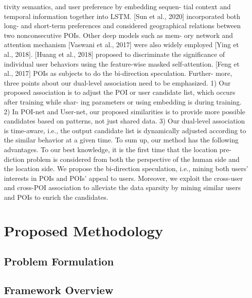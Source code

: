 \documentclass{article}
\begin{document}
tivity semantics, and user preference by embedding sequen-
tial context and temporal information together into LSTM.
[Sun et al., 2020] incorporated both long- and short-term
preferences and considered geographical relations between
two nonconsecutive POIs. Other deep models such as mem-
ory network and attention mechanism [Vaswani et al., 2017]
were also widely employed [Ying et al., 2018]. [Huang et al.,
2018] proposed to discriminate the significance of individual
user behaviors using the feature-wise masked self-attention.
[Feng et al., 2017]
POIs as subjects to do the bi-direction speculation. Further-
more, three points about our dual-level association need to be
emphasized. 1) Our proposed association is to adjust the POI
or user candidate list, which occurs after training while shar-
ing parameters or using embedding is during training. 2) In
POI-net and User-net, our proposed similarities is to provide
more possible candidates based on patterns, not just shared
data. 3) Our dual-level association is time-aware, i.e., the
output candidate list is dynamically adjusted according to the
similar behavior at a given time.
To sum up, our method has the following advantages. To
our best knowledge, it is the first time that the location pre-
diction problem is considered from both the perspective of the
human side and the location side. We propose the bi-direction
speculation, i.e., mining both users’ interests in POIs and
POIs’ appeal to users. Moreover, we exploit the cross-user and cross-POI association to alleviate the data sparsity by
mining similar users and POIs to enrich the candidates.

\section{Proposed Methodology}
\subsection{Problem Formulation}
\subsection{Framework Overview}
\end{document}
